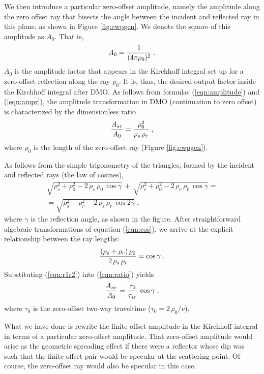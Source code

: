 

\par We then introduce a particular zero-offset amplitude, namely the
amplitude along the zero offset ray that bisects the angle between the
incident and reflected ray in this plane, as shown in Figure
\ref{fig:cwpgen}.  We denote the square of this amplitude as $A_0$.
That is,
\begin{equation}
A_0 = {1 \over {(4 \pi \rho_0 )^2}}\;.
\label{eqn:azero}
\end{equation}
$A_0$ is the amplitude factor that appears in the Kirchhoff integral
set up for a zero-offset reflection along the ray $\rho_0$. It is,
thus, the desired output factor inside the Kirchhoff integral after
DMO. As follows from formulas (\ref{eqn:amplitude}) and
(\ref{eqn:ampr}), the amplitude transformation in DMO (continuation to
zero offset) is characterized by the dimensionless ratio
\begin{equation}
{A_{sr} \over A_0} = {{\rho_0^2}\over {\rho_s\,\rho_r}}\;,
\label{eqn:ratio}
\end{equation}
where $\rho_0$ is the length of the zero-offset ray (Figure \ref{fig:cwpgen}).
\par
As follows from the simple trigonometry of the triangles, formed by
the incident and reflected rays (the law of cosines),
\begin{eqnarray} 
\sqrt{\rho_s^2 + \rho_0^2 - 2\,\rho_s\,\rho_0\,\cos{\gamma}} \,
+\, \sqrt{\rho_r^2 + \rho_0^2 - 2\,\rho_r\,\rho_0\,\cos{\gamma}}
 = 
\nonumber \\
= \sqrt{\rho_s^2 + \rho_r^2 - 2\,\rho_s\,\rho_r\,\cos{2\gamma}} \;,
\label{eqn:cos}
\end{eqnarray} 
where $\gamma$ is the reflection angle, as shown in the figure.
After straightforward
algebraic transformations of equation (\ref{eqn:cos}), we arrive at the
explicit relationship between the ray lengths:
\begin{equation}
{{(\rho_s + \rho_r)\,\rho_0} \over {2\,\rho_s\,\rho_r}} = 
\cos{\gamma}\;.
\label{eqn:r1r2}
\end{equation}
Substituting (\ref{eqn:r1r2}) into (\ref{eqn:ratio}) yields
\begin{equation} 
{A_{sr} \over A_0} = {\tau_0 \over \tau_{sr}}\,\cos{\gamma}\;,
\label{eqn:ratrat}
\end{equation}
where $\tau_0$ is the zero-offset two-way
traveltime ($\tau_0 = 2\,\rho_0/v$).
\par
What we have done is rewrite the finite-offset amplitude in the
Kirchhoff integral in terms of a particular zero-offset amplitude.
That zero-offset amplitude would arise as the geometric spreading
effect if there were a reflector whose dip was such that the
finite-offset pair would be specular at the scattering point.  Of
course, the zero-offset ray would also be specular in this case.
 
